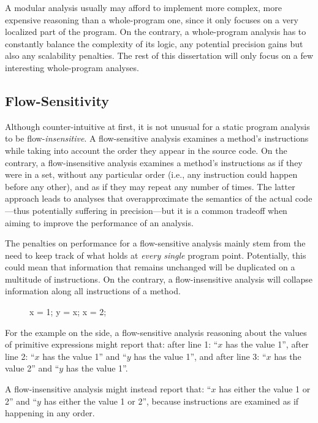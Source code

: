 A modular analysis usually may afford to implement more complex, more expensive
reasoning than a whole-program one, since it only focuses on a very localized
part of the program. On the contrary, a whole-program analysis has to
constantly balance the complexity of its logic,  any potential precision gains
but also any scalability penalties. The rest of this dissertation will only
focus on a few interesting whole-program analyses.


\subsection{Flow-Sensitivity} \label{flowSensitivity}

Although counter-intuitive at first, it is not unusual for a static program
analysis to be flow-\emph{insensitive}. A flow-sensitive analysis examines a
method's instructions while taking into account the order they appear in the
source code.  On the contrary, a flow-insensitive analysis examines a method's
instructions as if they were in a set, without any particular order (i.e., any
instruction could happen before any other), and as if they may repeat any
number of times.  The latter approach leads to analyses that overapproximate
the semantics of the actual code---thus potentially suffering in
precision---but it is a common tradeoff when aiming to improve the performance
of an analysis.

The penalties on performance for a flow-sensitive analysis mainly stem from the
need to keep track of what holds at \emph{every single} program point.
Potentially, this could mean that information that remains unchanged will be
duplicated on a multitude of instructions. On the contrary, a flow-insensitive
analysis will collapse information along all instructions of a method.

{
\setlength\intextsep{-10pt}
\begin{figure}
\centering
\begin{javacode}
x = 1;
y = x;
x = 2;
\end{javacode}
\end{figure}

For the example on the side, a flow-sensitive analysis reasoning about the
values of primitive expressions might report that:
after line 1: ``$x$ has the value 1'',
after line 2: ``$x$ has the value 1'' and ``$y$ has the value 1'', and
after line 3: ``$x$ has the value 2'' and ``$y$ has the value 1''.

A flow-insensitive analysis might instead report that:
``$x$ has either the value 1 or 2'' and ``$y$ has either the value 1 or 2'',
because instructions are examined as if happening in any order.
}



